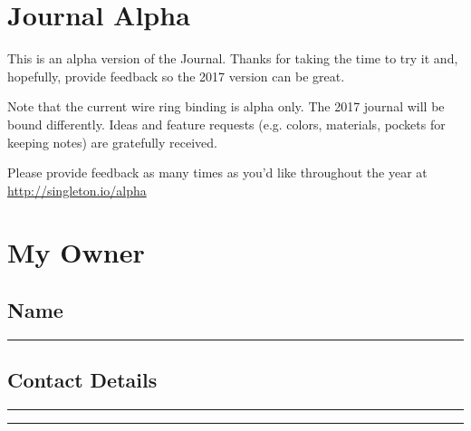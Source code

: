 \section{Journal Alpha}

This is an alpha version of the Journal.  Thanks for taking the time to try it and, hopefully, provide feedback so the 2017 version can be great.

Note that the current wire ring binding is alpha only.  The 2017 journal will be bound differently.  Ideas and feature requests (e.g. colors, materials, pockets for keeping notes) are gratefully received.

Please provide feedback as many times as you'd like throughout the year at \url{http://singleton.io/alpha}

\section{My Owner}

\subsection{Name}
{\color{WriteBgMain}
\rule{\textwidth}{1pt}\par}

\subsection{Contact Details}
{\color{WriteBgMain}
\rule{\textwidth}{1pt}\par
\rule{\textwidth}{1pt}\par}

\pagebreak
\pagebreak
\pagebreak